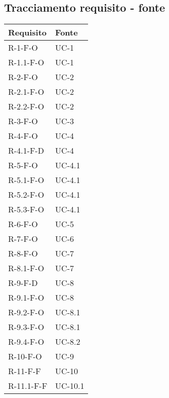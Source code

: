\subsection{Tracciamento requisito - fonte}\label{subsec:tracciamento-requisiti---fonte}
\renewcommand{\arraystretch}{1.5}

\begin{longtable}{| C{6cm} |C{6cm}|}
    \hline
    \textbf{Requisito} & \textbf{Fonte}  \\\hline
    R-1-F-O            & UC-1            \\\hline
    R-1.1-F-O          & UC-1            \\\hline
    R-2-F-O            & UC-2            \\\hline
    R-2.1-F-O          & UC-2            \\\hline
    R-2.2-F-O          & UC-2            \\\hline
    R-3-F-O            & UC-3            \\\hline
    R-4-F-O            & UC-4            \\\hline
    R-4.1-F-D          & UC-4            \\\hline
    R-5-F-O            & UC-4.1          \\\hline
    R-5.1-F-O          & UC-4.1          \\\hline
    R-5.2-F-O          & UC-4.1          \\\hline
    R-5.3-F-O          & UC-4.1          \\\hline
    R-6-F-O            & UC-5            \\\hline
    R-7-F-O            & UC-6            \\\hline
    R-8-F-O            & UC-7            \\\hline
    R-8.1-F-O          & UC-7            \\\hline
    R-9-F-D            & UC-8            \\\hline
    R-9.1-F-O          & UC-8            \\\hline
    R-9.2-F-O          & UC-8.1          \\\hline
    R-9.3-F-O          & UC-8.1          \\\hline
    R-9.4-F-O          & UC-8.2          \\\hline
    R-10-F-O           & UC-9            \\\hline
    R-11-F-F           & UC-10           \\\hline
    R-11.1-F-F         & UC-10.1         \\\hline

\end{longtable}
